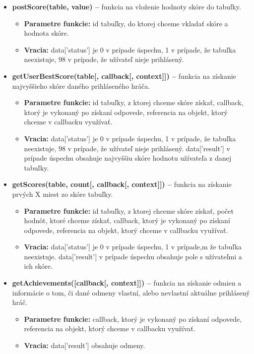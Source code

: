 \begin{itemize}
\item \textbf{postScore(table, value) –} funkcia na vloženie hodnoty skóre do tabuľky.
\begin{itemize}
\item \textbf{Parametre funkcie:} id tabuľky, do ktorej chceme vkladať skóre a hodnota skóre. 
\item \textbf{Vracia:} data['status'] je 0 v prípade úspechu, 1 v prípade, že tabuľka neexistuje, 98 v prípade, že užívateľ nieje prihlásený.
\end{itemize}

\item \textbf{getUserBestScore(table[, callback[, context]]) –} funkcia na získanie najvyššieho skóre daného prihláseného hráča.
\begin{itemize}
\item \textbf{Parametre funkcie:} id tabuľky, z ktorej chceme skóre získať, callback, ktorý je vykonaný po získaní odpovede, referencia na objekt, ktorý chceme v callbacku využívať. 
\item \textbf{Vracia:} data['status'] je 0 v prípade úspechu, 1 v prípade, že tabuľka neexistuje, 98 v prípade, že užívateľ nieje prihlásený. data['result'] v prípade úspechu obsahuje najvyššiu skóre hodnotu užívateľa z danej tabuľky.
\end{itemize}

\item \textbf{getScores(table, count[, callback[, context]]) –} funkcia na získanie prvých X miest zo skóre tabuľky.
\begin{itemize}
\item \textbf{Parametre funkcie:} id tabuľky, z ktorej chceme skóre získať, počet hodnôt, ktoré chceme získať, callback, ktorý je vykonaný po získaní odpovede, referencia na objekt, ktorý chceme v callbacku využívať. 
\item \textbf{Vracia:} data['status'] je 0 v prípade úspechu, 1 v prípade,m že tabuľka neexistuje. data['result'] v prípade úspechu obsahuje pole s užívateľmi a ich skóre.
\end{itemize}

\item \textbf{getAchievements([callback[, context]]) –} funkcia na získanie odmien a informácie o tom, či dané odmeny vlastní, alebo nevlastní aktuálne prihlásený hráč.
\begin{itemize}
\item \textbf{Parametre funkcie:} callback, ktorý je vykonaný po získaní odpovede, referencia na objekt, ktorý chceme v callbacku využívať. 
\item \textbf{Vracia:} data['result'] obsahuje odmeny.
\end{itemize}


\end{itemize}
